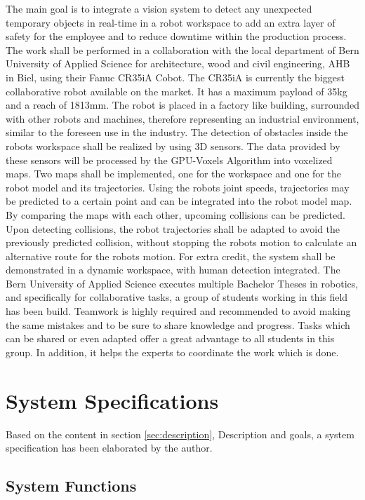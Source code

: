 The main goal is to integrate a vision system to detect any unexpected temporary objects in real-time in a robot workspace to add an extra layer of safety for the employee and to reduce downtime within the production process. The work shall be performed in a collaboration with the local department of Bern University of Applied Science for architecture, wood and civil engineering, AHB in Biel, using their Fanuc CR35iA Cobot. 
The CR35iA is currently the biggest collaborative robot available on the market. It has a maximum payload of 35kg and a reach of 1813mm. The robot is placed in a factory like building, surrounded with other robots and machines, therefore representing an industrial environment, similar to the foreseen use in the industry.
The detection of obstacles inside the robots workspace shall be realized by using 3D sensors. The data provided by these sensors will be processed by the GPU-Voxels Algorithm into voxelized maps. Two maps shall be implemented, one for the workspace and one for the robot model and its trajectories. Using the robots joint speeds, trajectories may be predicted to a certain point and can be integrated into the robot model map. By comparing the maps with each other, upcoming collisions can be predicted. Upon detecting collisions, the robot trajectories shall be adapted to avoid the previously predicted collision, without stopping the robots motion to calculate an alternative route for the robots motion. For extra credit, the system shall be demonstrated in a dynamic workspace, with human detection integrated.
The Bern University of Applied Science executes multiple Bachelor Theses in robotics, and specifically for collaborative tasks, a group of students working in this field has been build. Teamwork is highly required and recommended to avoid making the same mistakes and to be sure to share knowledge and progress. Tasks which can be shared or even adapted offer a great advantage to all students in this group. In addition, it helps the experts to coordinate the work which is done. 


\section{System Specifications}
\label{sec:requirements}
Based on the content in section \ref{sec:description}, Description and goals, a system specification has been elaborated by the author. 

\subsection{System Functions}
